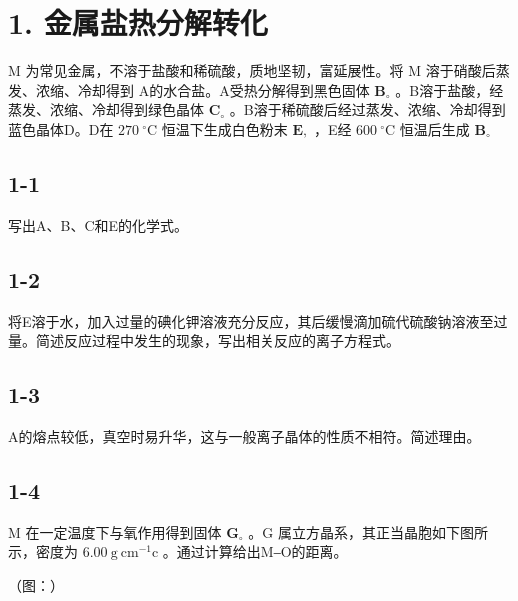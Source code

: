 \section*{1. 金属盐热分解转化}
M 为常⻅⾦属，不溶于盐酸和稀硫酸，质地坚韧，富延展性。将 M 溶于硝酸后蒸发、浓缩、冷却得到 A的⽔合盐。A受热分解得到⿊⾊固体 $\mathbf { B } _ { \circ }$ 。B溶于盐酸，经蒸发、浓缩、冷却得到绿⾊晶体 $\mathbf { C } _ { \circ }$ 。B溶于稀硫酸后经过蒸发、浓缩、冷却得到蓝⾊晶体D。D在 $2 7 0 ~ ^ { \circ } \mathrm { C }$ 恒温下⽣成⽩⾊粉末 $\mathbf { E } ,$ ，E经 $6 0 0 ~ ^ { \circ } \mathrm { C }$ 恒温后⽣成 $\mathbf { B } _ { \circ }$

\subsection*{1-1}
写出A、B、C和E的化学式。

\subsection*{1-2}
将E溶于⽔，加⼊过量的碘化钾溶液充分反应，其后缓慢滴加硫代硫酸钠溶液⾄过量。简述反应过程中发⽣的现象，写出相关反应的离⼦⽅程式。

\subsection*{1-3}
A的熔点较低，真空时易升华，这与⼀般离⼦晶体的性质不相符。简述理由。

\subsection*{1-4}
M 在⼀定温度下与氧作⽤得到固体 $\mathbf { G } _ { \circ }$ 。G 属⽴⽅晶系，其正当晶胞如下图所⽰，密度为 $6 . 0 0 \ \mathrm { g \ c m ^ { - 1 } c }$ 。通过计算给出M‒O的距离。

（图：）
